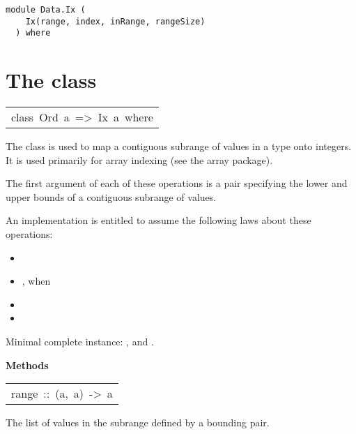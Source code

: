 \label{module:Data.Ix}
\haddockbeginheader
{\haddockverb\begin{verbatim}
module Data.Ix (
    Ix(range, index, inRange, rangeSize)
  ) where\end{verbatim}}
\haddockendheader

\section{The  class
}
\begin{haddockdesc}
\item[\begin{tabular}{@{}l}
class\ Ord\ a\ =>\ Ix\ a\ where
\end{tabular}]\haddockbegindoc
The  class is used to map a contiguous subrange of values in
 a type onto integers.  It is used primarily for array indexing
 (see the array package).
\par
The first argument  of each of these operations is a pair
 specifying the lower and upper bounds of a contiguous subrange of values.
\par
An implementation is entitled to assume the following laws about these
 operations:
\par
\begin{itemize}
\item
  \haddocktt{\ }
\par

\item
 , when 
\par

\item
  \haddocktt{\ }
\par

\item
  \haddocktt{\ }
\par

\end{itemize}
Minimal complete instance: ,  and .
\par

\haddockpremethods{}\textbf{Methods}
\begin{haddockdesc}
\item[\begin{tabular}{@{}l}
range\ ::\ (a,\ a)\ ->\ {\char 91}a{\char 93}
\end{tabular}]\haddockbegindoc
The list of values in the subrange defined by a bounding pair.
\par


\end{haddockdesc}
\end{haddockdesc}
